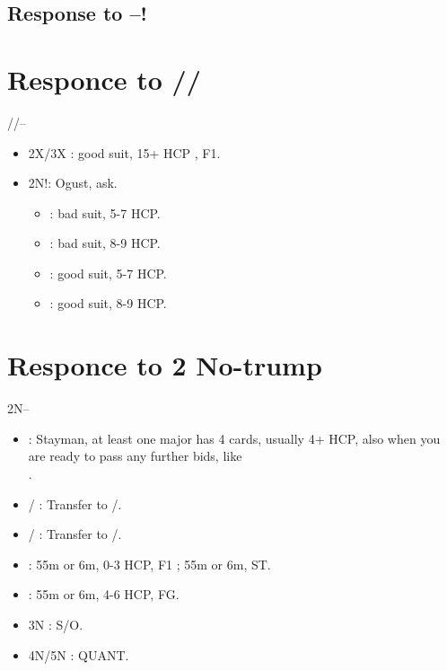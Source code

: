 \documentclass[12pt,twoside,a5paper]{report}%
\begin{document}
	\section*{Response to --!}

\chapter*{Responce to /\he{}/\sp{}}
	//-- \\
	\begin{itemize}
	\renewcommand{\labelitemi}{}	
	\item 2X/3X : good suit, 15+ HCP , F1.
	\item 2N!: Ogust, ask.
		\begin{itemize}
		\renewcommand{\labelitemi}{--}
			\item {} : bad suit, 5-7 HCP.
			\item {} : bad suit, 8-9 HCP.
			\item {} : good suit, 5-7 HCP.
			\item {} : good suit, 8-9 HCP.
		\end{itemize}
	\end{itemize}

\chapter*{Responce to 2 No-trump}
	2N--\\
	\begin{itemize}
	\renewcommand{\labelitemi}{}
	\item {}: Stayman, at least one major has 4 cards, usually 4+ HCP, also when you are ready to pass any further bids, like \\.
	\item {}/ : Transfer to /.
	\item {}/ : Transfer to /.
	\item {} : 55m or 6m, 0-3 HCP, F1 ; 55m or 6m, ST.
	\item {} : 55m or 6m, 4-6 HCP,  FG. 
	\item 3N : S/O.
	\item 4N/5N : QUANT.
	\end{itemize}
\end{document}
